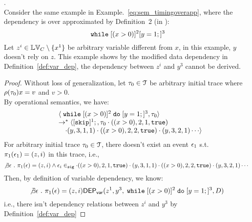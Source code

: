 \begin{example}.
\\
Consider the same example in Example.~\ref{eq:sem_timingoverapp}, where the dependency is over approximated by Definition~2 (in \cite{cousot2019abstract}):
\[
	\;\mathtt{while}\; [(x > 0)] {}^2 [ y = 1;]{}^3 
\]
Let $z^i \in \mathbb{LV}_{C} \setminus \{x^1\}$ be arbitrary variable different from $x$,
in this example, $y$ doesn't rely on $z$. 
This example shows by the modified data dependency in Definition~\ref{def:var_dep}, the dependency between $z^i$ and $y^3$ cannot be derived.
%
\begin{proof}
%
Without loss of generalization, 
let $\mathtt{\tau}_0 \in \mathcal{T}$ be arbitrary initial trace where $\rho(\mathtt{\tau}_0) x = v$ and $v > 0$.
\\
By operational semantics, we have:
\[
\label{eq:os_timingdep}
\begin{array}{ll}
& \config{\ewhile  [(x > 0)]{}^2 \edo [y = 1;]{}^3 , \trace_0} \\
& \rightarrow^*
\config{[\eskip]{}^1;, 
\trace_0 \cdot ((x > 0), 2, 1, \etrue) \\
& \quad \cdot(y, 3, 1, 1) \cdot ((x > 0), 2, 2, \etrue) \cdot(y, 3, 2, 1) \cdots} \\
\end{array}
\]
%
For arbitrary initial trace $\mathtt{\tau}_0 \in \mathcal{T}$, there doesn't exist an event $\mathtt{\epsilon}_1$ s.t. $\pi_1(\mathtt{\epsilon}_1) = (z, i)$ in this trace, i.e.,
\[
  \not\exists \mathtt{\epsilon} ~.~ \pi_1(\mathtt{\epsilon}) = (z, i) \land
 \mathtt{\epsilon}_i \in_{\mathtt{sig}} \cdot ((x > 0), 2, 1, \mathtt{true}) \cdot(y, 3, 1, 1) \cdot ((x > 0), 2, 2, \mathtt{true}) \cdot(y, 3, 2, 1) \cdots
\]
%
Then, by definition of variable dependency, we know:
\[ 
\not\exists \mathtt{\epsilon} ~.~ \pi_1(\mathtt{\epsilon}) = (z, i) \mathsf{DEP_{var}}(z^1, y^3, \;\mathtt{while}\;  [(x > 0)]{}^2 \;\mathtt{do}\; [y = 1;]{}^3, D)
\]
%
i.e., there isn't dependency relations between $z^i$ and $y^3$ by Definition~\ref{def:var_dep}
\end{proof}
\end{example}
%
